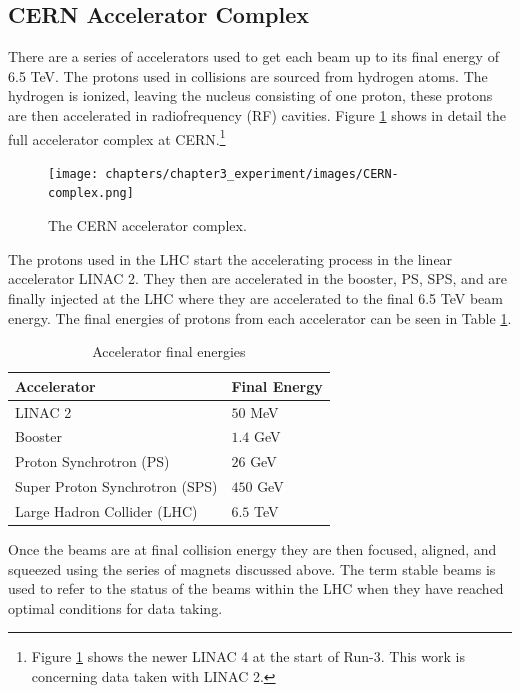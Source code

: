 	\subsection{CERN Accelerator Complex}\label{ssec:cern-accelerators}
		There are a series of accelerators used to get each beam up to its final energy of 6.5 TeV. The protons used in collisions are sourced from hydrogen atoms. The hydrogen is ionized, leaving the nucleus consisting of one proton, these protons are then accelerated in radiofrequency (RF) cavities. Figure \ref{fig:CERN-complex} shows in detail the full accelerator complex at CERN.\footnote{Figure \ref{fig:CERN-complex} shows the newer LINAC 4 at the start of Run-3. This work is concerning data taken with LINAC 2.} 
		\begin{figure}[!ht]
		\centering
		\texttt{[image: chapters/chapter3\_experiment/images/CERN-complex.png]}
		\caption{The CERN accelerator complex. \cite{CERN-complex}}
		\label{fig:CERN-complex}
		\end{figure}
		The protons used in the \gls{LHC} start the accelerating process in the linear accelerator LINAC 2. They then are accelerated in the booster, PS, SPS, and are finally injected at the \gls{LHC} where they are accelerated to the final 6.5 TeV beam energy. The final energies of protons from each accelerator can be seen in Table \ref{tab:accelerator-complex}.
		\begin{table}[!thp]
			\centering
			\caption{Accelerator final energies}
			\begin{tabular}{| l | l |}  
			\hline
			Accelerator 					& Final Energy 	\\ \hline
			\hline
			LINAC 2 						& $50$ MeV 		\\ 	\hline
			Booster 						& $1.4$ GeV 	\\ 	\hline
			Proton Synchrotron (PS)			& $26$ GeV 		\\ 	\hline
			Super Proton Synchrotron (SPS) 	& $450$ GeV 	\\ 	\hline
			Large Hadron Collider (LHC)		& $6.5$ TeV 	\\ 	\hline
			\end{tabular}
			\label{tab:accelerator-complex}
		\end{table}
		Once the beams are at final collision energy they are then focused, aligned, and squeezed using the series of magnets discussed above. The term stable beams is used to refer to the status of the beams within the LHC when they have reached optimal conditions for data taking.

